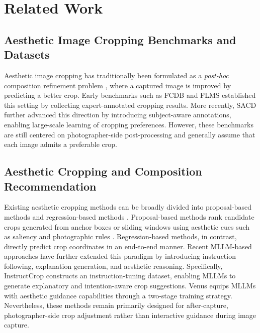 \documentclass{article} %
\begin{document}
\section{Related Work}

\subsection{Aesthetic Image Cropping Benchmarks and Datasets}

Aesthetic image cropping has traditionally been formulated as a \emph{post-hoc} composition refinement problem \citep{yan2013learning,hong2024learning,yang2023focusing,zeng2019reliable,wei2018good,chen2017quantitative,fang2014automatic,zhang2022human}, where a captured image is improved by predicting a better crop. Early benchmarks such as FCDB \citep{chen2017quantitative} and FLMS \citep{fang2014automatic} established this setting by collecting expert-annotated cropping results. More recently, SACD \citep{zhang2022human} further advanced this direction by introducing subject-aware annotations, enabling large-scale learning of cropping preferences. However, these benchmarks are still centered on photographer-side post-processing and generally assume that each image admits a preferable crop.

\subsection{Aesthetic Cropping and Composition Recommendation}

Existing aesthetic cropping methods can be broadly divided into proposal-based methods \citep{su2024spatial,zeng2019reliable,zhang2026procrop} and regression-based methods \citep{hong2021composing,huang2024multi,pan2021robust,du2026venus,sheng2025instructcrop}. Proposal-based methods rank candidate crops generated from anchor boxes or sliding windows using aesthetic cues such as saliency and photographic rules \citep{ni2013learning,fang2014automatic,zeng2019reliable}. Regression-based methods, in contrast, directly predict crop coordinates in an end-to-end manner. Recent MLLM-based approaches have further extended this paradigm by introducing instruction following, explanation generation, and aesthetic reasoning. Specifically, InstructCrop \citep{sheng2025instructcrop} constructs an instruction-tuning dataset, enabling MLLMs to generate explanatory and intention-aware crop suggestions. Venus \citep{du2026venus} equips MLLMs with aesthetic guidance capabilities through a two-stage training strategy. Nevertheless, these methods remain primarily designed for after-capture, photographer-side crop adjustment rather than interactive guidance during image capture.
\end{document}
